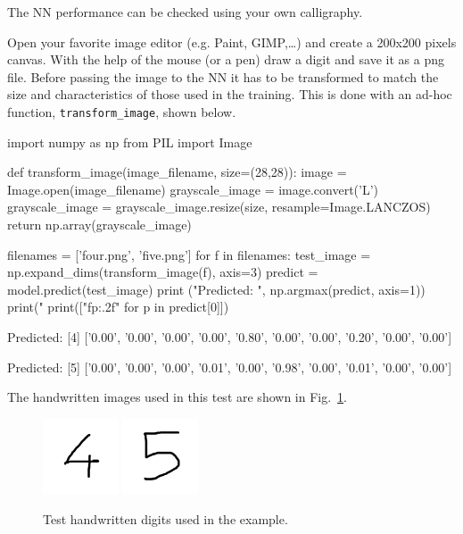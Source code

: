 The NN performance can be checked using your own calligraphy. 

Open your favorite image editor (e.g. Paint, GIMP,\ldots) and create a 200x200 pixels canvas. With the help of the mouse (or a pen) draw a digit and save it as a png file.
Before passing the image to the NN it has to be transformed to match the size and characteristics of those used in the training. This is done with an ad-hoc function, \texttt{transform\_image}, shown below.

\begin{ipython}
import numpy as np
from PIL import Image

def transform_image(image_filename, size=(28,28)):
    image = Image.open(image_filename)
    grayscale_image = image.convert('L')
    grayscale_image = grayscale_image.resize(size, resample=Image.LANCZOS)
    return np.array(grayscale_image)

filenames = ['four.png', 'five.png']
for f in filenames:
    test_image = np.expand_dims(transform_image(f), axis=3)
    predict = model.predict(test_image)
    print ("Predicted: ", np.argmax(predict, axis=1))
    print("%
    print(["f{p:.2f}" for p in predict[0]])
\end{ipython}
\begin{ioutput}
Predicted:  [4]
['0.00', '0.00', '0.00', '0.00', '0.80', '0.00', '0.00', '0.20', '0.00', 
'0.00']

Predicted:  [5]
['0.00', '0.00', '0.00', '0.01', '0.00', '0.98', '0.00', '0.01', '0.00', 
'0.00']
\end{ioutput}
The handwritten images used in this test are shown in Fig.~\ref{fig:test_images}.

\begin{figure}[htb]
\centering
\includegraphics[width=0.2\textwidth]{figures/four.png}
\includegraphics[width=0.2\textwidth]{figures/five.png}
\caption{Test handwritten digits used in the example.}
\label{fig:test_images}
\end{figure}

